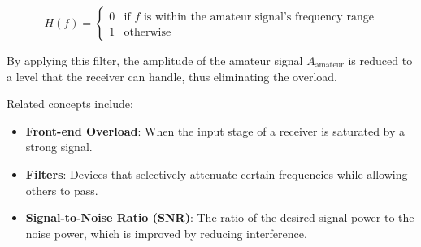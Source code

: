 \[
H(f) = \begin{cases}
0 & \text{if } f \text{ is within the amateur signal's frequency range} \\
1 & \text{otherwise}
\end{cases}
\]

By applying this filter, the amplitude of the amateur signal \( A_{\text{amateur}} \) is reduced to a level that the receiver can handle, thus eliminating the overload.

Related concepts include:
\begin{itemize}
    \item \textbf{Front-end Overload}: When the input stage of a receiver is saturated by a strong signal.
    \item \textbf{Filters}: Devices that selectively attenuate certain frequencies while allowing others to pass.
    \item \textbf{Signal-to-Noise Ratio (SNR)}: The ratio of the desired signal power to the noise power, which is improved by reducing interference.
\end{itemize}

